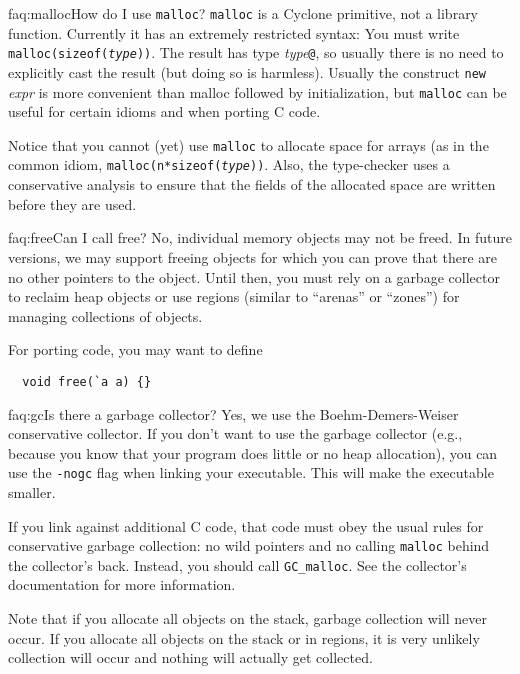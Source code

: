 \begin{faqa}{faq:malloc}{How do I use \texttt{malloc}?}
\texttt{malloc} is a Cyclone primitive, not a library function.
Currently it has an extremely restricted syntax: You must write
\texttt{malloc(sizeof(\textit{type}))}.  The result has type
\textit{type}\texttt{@}, so usually there is no need to explicitly
cast the result (but doing so is harmless).  Usually the construct
\texttt{new} \textit{expr} is more convenient than malloc followed by
initialization, but \texttt{malloc} can be useful for certain idioms
and when porting C code.

Notice that you cannot (yet) use \texttt{malloc} to allocate space for
arrays (as in the common idiom, \texttt{malloc(n*sizeof({\it type}))}.
Also, the type-checker uses a conservative analysis to ensure that the
fields of the allocated space are written before they are used.
\end{faqa}

\begin{faqa}{faq:free}{Can I call free?}
No, individual memory objects may not be freed.  In future versions,
we may support freeing objects for which you can prove that there are
no other pointers to the object.  Until then, you must rely on a
garbage collector to reclaim heap objects or use regions (similar to
``arenas'' or ``zones'') for managing collections of objects.

For porting code, you may want to define
\begin{verbatim}
  void free(`a a) {}
\end{verbatim}
\end{faqa}

\begin{faqa}{faq:gc}{Is there a garbage collector?}
Yes, we use the Boehm-Demers-Weiser conservative collector.  If you
don't want to use the garbage collector (e.g., because you know that
your program does little or no heap allocation), you can use the
\texttt{-nogc} flag when linking your executable.  This will make the
executable smaller.

If you link against additional C code, that code must obey the usual
rules for conservative garbage collection: no wild pointers and no
calling \texttt{malloc} behind the collector's back.  Instead, you
should call \texttt{GC_malloc}.  See the collector's documentation for
more information.

Note that if you allocate all objects on the stack, garbage collection
will never occur.  If you allocate all objects on the stack or in
regions, it is very unlikely collection will occur and nothing will
actually get collected.
\end{faqa}

